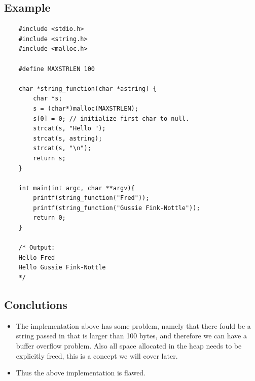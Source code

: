 \subsection{Example}
\begin{verbatim}
    #include <stdio.h>
    #include <string.h>
    #include <malloc.h>

    #define MAXSTRLEN 100

    char *string_function(char *astring) {
        char *s;
        s = (char*)malloc(MAXSTRLEN);
        s[0] = 0; // initialize first char to null.
        strcat(s, "Hello ");
        strcat(s, astring);
        strcat(s, "\n");
        return s;
    }

    int main(int argc, char **argv){
        printf(string_function("Fred"));
        printf(string_function("Gussie Fink-Nottle"));
        return 0;
    }

    /* Output:
    Hello Fred
    Hello Gussie Fink-Nottle
    */
\end{verbatim}

\subsection{Conclutions}
\begin{itemize}
    \item The implementation above has some problem, namely that there fould be a string passed in that is larger than 100 bytes, and therefore we can have a buffer overflow problem. Also all space allocated in the heap needs to be explicitly freed, this is a concept we will cover later. 
    \item Thus the above implementation is flawed.
\end{itemize}

